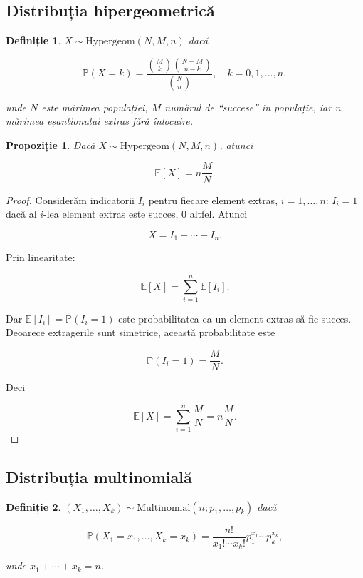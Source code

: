 \documentclass[12pt]{article}
\theoremstyle{plain}
\newtheorem{definition}{Definiție}
\newtheorem{proposition}{Propoziție}
\begin{document}
\subsection{Distribuția hipergeometrică}

\begin{definition}
$X \sim \mathrm{Hypergeom}(N,M,n)$ dacă


\[
\mathbb{P}(X = k)
= \frac{\binom{M}{k} \binom{N-M}{n-k}}{\binom{N}{n}},
\quad k=0,1,\dots,n,
\]


unde $N$ este mărimea populației, $M$ numărul de ``succese'' în populație,
iar $n$ mărimea eșantionului extras fără înlocuire.
\end{definition}

\begin{proposition}
Dacă $X \sim \mathrm{Hypergeom}(N,M,n)$, atunci


\[
\mathbb{E}[X] = n \frac{M}{N}.
\]


\end{proposition}

\begin{proof}
Considerăm indicatorii $I_i$ pentru fiecare element extras, $i=1,\dots,n$:
$I_i = 1$ dacă al $i$-lea element extras este succes, $0$ altfel.
Atunci


\[
X = I_1 + \cdots + I_n.
\]


Prin linearitate:


\[
\mathbb{E}[X] = \sum_{i=1}^n \mathbb{E}[I_i].
\]


Dar $\mathbb{E}[I_i] = \mathbb{P}(I_i=1)$ este probabilitatea ca un element extras
să fie succes. Deoarece extragerile sunt simetrice, această probabilitate este


\[
\mathbb{P}(I_i=1) = \frac{M}{N}.
\]


Deci


\[
\mathbb{E}[X] = \sum_{i=1}^n \frac{M}{N} = n \frac{M}{N}.
\]


\end{proof}

\subsection{Distribuția multinomială}

\begin{definition}
$(X_1,\dots,X_k) \sim \mathrm{Multinomial}(n; p_1,\dots,p_k)$ dacă


\[
\mathbb{P}(X_1=x_1,\dots,X_k=x_k)
= \frac{n!}{x_1!\cdots x_k!} p_1^{x_1}\cdots p_k^{x_k},
\]


unde $x_1+\cdots+x_k = n$.
\end{definition}
\end{document}
